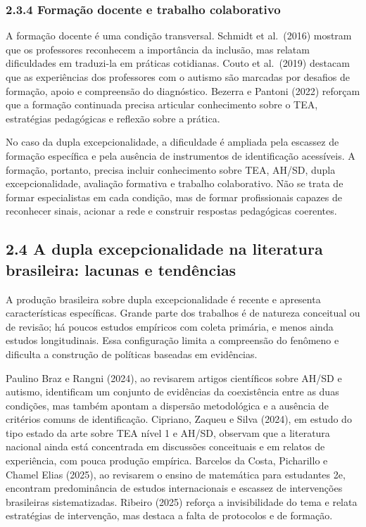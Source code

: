 \subsubsection{2.3.4 Formação docente e trabalho
colaborativo}\label{formauxe7uxe3o-docente-e-trabalho-colaborativo}

A formação docente é uma condição transversal. Schmidt et al.~(2016)
mostram que os professores reconhecem a importância da inclusão, mas
relatam dificuldades em traduzi-la em práticas cotidianas. Couto et
al.~(2019) destacam que as experiências dos professores com o autismo
são marcadas por desafios de formação, apoio e compreensão do
diagnóstico. Bezerra e Pantoni (2022) reforçam que a formação continuada
precisa articular conhecimento sobre o TEA, estratégias pedagógicas e
reflexão sobre a prática.

No caso da dupla excepcionalidade, a dificuldade é ampliada pela
escassez de formação específica e pela ausência de instrumentos de
identificação acessíveis. A formação, portanto, precisa incluir
conhecimento sobre TEA, AH/SD, dupla excepcionalidade, avaliação
formativa e trabalho colaborativo. Não se trata de formar especialistas
em cada condição, mas de formar profissionais capazes de reconhecer
sinais, acionar a rede e construir respostas pedagógicas coerentes.

\subsection{2.4 A dupla excepcionalidade na literatura brasileira:
lacunas e
tendências}\label{a-dupla-excepcionalidade-na-literatura-brasileira-lacunas-e-tenduxeancias}

A produção brasileira sobre dupla excepcionalidade é recente e apresenta
características específicas. Grande parte dos trabalhos é de natureza
conceitual ou de revisão; há poucos estudos empíricos com coleta
primária, e menos ainda estudos longitudinais. Essa configuração limita
a compreensão do fenômeno e dificulta a construção de políticas baseadas
em evidências.

Paulino Braz e Rangni (2024), ao revisarem artigos científicos sobre
AH/SD e autismo, identificam um conjunto de evidências da coexistência
entre as duas condições, mas também apontam a dispersão metodológica e a
ausência de critérios comuns de identificação. Cipriano, Zaqueu e Silva
(2024), em estudo do tipo estado da arte sobre TEA nível 1 e AH/SD,
observam que a literatura nacional ainda está concentrada em discussões
conceituais e em relatos de experiência, com pouca produção empírica.
Barcelos da Costa, Picharillo e Chamel Elias (2025), ao revisarem o
ensino de matemática para estudantes 2e, encontram predominância de
estudos internacionais e escassez de intervenções brasileiras
sistematizadas. Ribeiro (2025) reforça a invisibilidade do tema e relata
estratégias de intervenção, mas destaca a falta de protocolos e de
formação.

